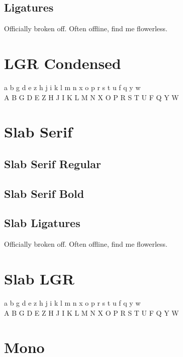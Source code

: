 \documentclass{article}
\begin{document}
{\robotocondensed\textsc{\lipsum[1]}}

\subsection*{Ligatures}

{\robotocondensed Officially broken off. Often offline, find me flowerless.}

\section*{LGR Condensed}


{\robotocondensed\robotolgr\noindent
 a b g d e z h j i k l m n x o p r s t u f q y w\\
 A B G D E Z H J I K L M N X O P R S T U F Q Y W\\
}

\section*{Slab Serif}

\subsection*{Slab Serif Regular}
{\robotoslab\lipsum[1]}


\subsection*{Slab Serif Bold}

{\robotoslab\textbf{\lipsum[3]}}

\subsection*{Slab Ligatures}


{\robotoslab Officially broken off. Often offline, find me flowerless.}


\section*{Slab LGR}


{\robotoslablgr\noindent
 a b g d e z h j i k l m n x o p r s t u f q y w\\
 A B G D E Z H J I K L M N X O P R S T U F Q Y W\\
}


\section*{Mono}
\end{document}
